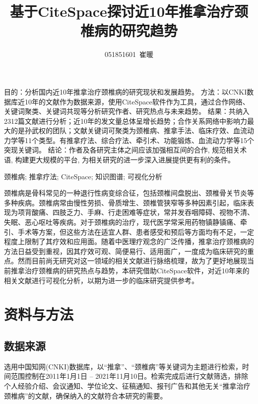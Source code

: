 \documentclass[lang=cn,11pt,a4paper,cite=super,AutoFakeBold,chinesefont=founder]{elegantpaper}
\title{基于CiteSpace探讨近10年推拿治疗颈椎病的研究趋势}
\author{051851601\ 崔暖}
\institute{\vspace*{-3em}}
\date{}
\newcommand{\cnabs}{\noindent{\small \textsf{摘要}}\quad}
\newcommand{\cnkys}{\noindent{\small \textsf{关键词}}\quad}
\begin{document}
\maketitle

\begin{onecolabstract}
\cnabs
目的：分析国内近10年推拿治疗颈椎病的研究现状和发展趋势。
方法：以CNKI数据库近10年的文献作为数据来源，使用CiteSpace软件作为工具，通过合作网络、关键词聚类、关键词共现等分析研究作者、研究热点与未来趋势。
结果：共纳入2312篇文献进行分析；近10年的发文量总体呈增长趋势；合作关系网络中影响力最大的是孙武权的团队；文献关键词可聚类为颈椎病、推拿手法、临床疗效、血流动力学等11个类型。有推拿疗法、综合疗法、牵引术、功能锻炼、血流动力学等15个突现关键词。
结论：作者及各研究主体之间应该加强相互间的合作, 规范相关术语, 构建更大规模的平台, 为相关研究的进一步深入进展提供更有利的条件。

\cnkys
颈椎病; 推拿疗法; CiteSpace; 知识图谱; 可视化分析
\end{onecolabstract}


颈椎病是骨科常见的一种退行性病变综合征，包括颈椎间盘脱出、颈椎骨关节炎等多种疾病。颈椎病常由慢性劳损、骨质增生、颈椎管狭窄等多种因素引起，临床表现为项背酸痛、四肢乏力、手麻、行走困难等症状，常并发吞咽障碍、视物不清、失眠、恶心呕吐等疾病。对于颈椎病的治疗，现代医学常采用药物镇静镇痛、牵引、手术等方案，但这些方法在适宜人群、患者感受和预后等方面均有不足，一定程度上限制了其疗效和应用面。随着中医理疗观念的广泛传播，推拿治疗颈椎病的方法日益受到重视，因其疗效可观、简便易行、适用面广，一度成为临床研究的重点。然而目前尚无研究对这一领域的相关文献进行脉络梳理，故为了更好地展现当前推拿治疗颈椎病的研究热点与趋势，本研究借助CiteSpace软件，对近10年来的相关文献进行可视化分析，以期为进一步的临床研究提供参考。

\section{资料与方法}

\subsection{数据来源}

选用中国知网(CNKI)数据库，以“推拿”、“颈椎病”等关键词为主题进行检索，时间范围控制在2011年1月1日 -- 2021年11月10日。检索完成后进行文献筛选，排除个人经验介绍、会议通知、学位论文、征稿通知、报刊广告和其他无关“推拿治疗颈椎病”的文献，确保纳入的文献符合本研究的需要。
\end{document}

